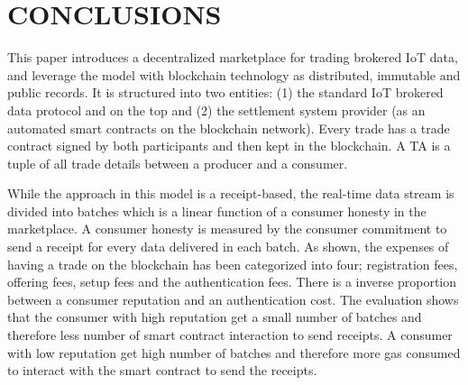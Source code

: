 \documentclass[letterpaper, 10 pt, conference]{ieeeconf}  %
\begin{document}

\section{CONCLUSIONS} \label{conclusion}

This paper introduces a decentralized marketplace for trading brokered IoT data, and leverage the model with blockchain technology as distributed, immutable and public records. It is structured into two entities: (1) the standard IoT brokered data protocol and on the top and (2) the settlement system provider (as an automated smart contracts on the blockchain network). Every trade has a trade contract signed by both participants and then kept in the blockchain. A TA is a tuple of all trade details between a producer and a consumer.

While the approach in this model is a receipt-based, the real-time data stream is divided into batches which is a linear function of a consumer honesty in the marketplace. A consumer honesty is measured by the consumer commitment to send a receipt for every data delivered in each batch.
As shown, the expenses of having a trade on the blockchain has been categorized into four; registration fees, offering fees, setup fees and the authentication fees. 
There is a inverse proportion between a consumer reputation and an authentication cost. The evaluation shows that the consumer with high reputation get a small number of batches and therefore less number of smart contract interaction to send receipts. A consumer with low reputation get high number of batches and therefore more gas consumed to interact with the smart contract to send the receipts. 

\end{document}
